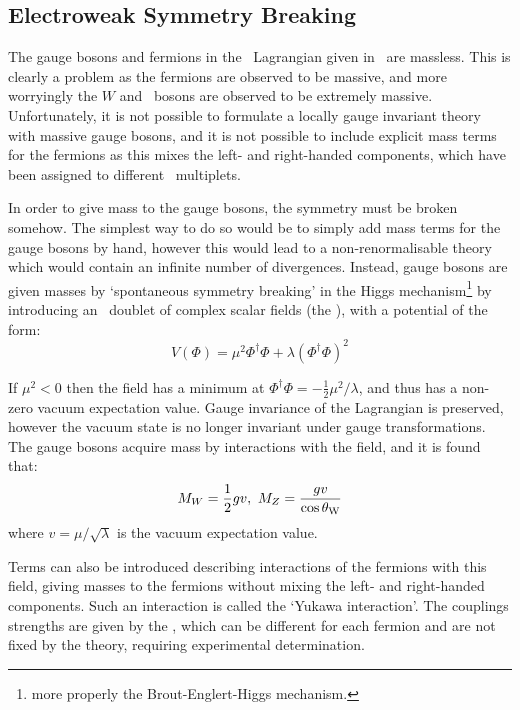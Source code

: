 \subsection{Electroweak Symmetry Breaking}

The gauge bosons and fermions in the \ew\ Lagrangian given
in~ are massless. This is clearly a problem as the fermions
are observed to be massive, and more worryingly the $W$ and \Z\ bosons are
observed to be extremely massive. Unfortunately, it is not possible to formulate a locally gauge invariant theory with massive
gauge bosons, and it is not possible to include explicit mass terms for the
fermions as this mixes the left- and right-handed components, which have been
assigned to different \sutwo\ multiplets. 

In order to give
mass to the gauge bosons, the symmetry must be broken somehow. The simplest way
to do so would be to simply add mass terms for the gauge bosons by hand, however
this would lead to a non-renormalisable theory which would contain an infinite
number of divergences. Instead, gauge bosons are given masses by `spontaneous
symmetry breaking' in the Higgs mechanism\footnote{more properly the Brout-Englert-Higgs
mechanism.} by introducing an \sutwo\ doublet of complex scalar fields (the ), with a potential of the form:
\begin{equation}
V(\Phi) =  \mu^{2}\Phi^{\dagger}\Phi + \lambda(\Phi^{\dagger}\Phi)^{2}
\end{equation}

If $\mu^{2} < 0$ then the field has a minimum at $\Phi^{\dagger}\Phi = -
\frac{1}{2} \mu^{2}/\lambda$, and thus has a non-zero vacuum expectation value. 
Gauge invariance of the Lagrangian is preserved, however the vacuum state is no
longer invariant under gauge transformations.
The gauge bosons acquire mass by interactions with the field, and it is found
that:
\begin{equation}
M_{W} = \frac{1}{2}gv, \ M_{Z} = \frac{gv}{\cos{\ensuremath{\theta_{\mathrm{W}}}}}
\end{equation}
where $v = \mu / \sqrt{\lambda}$ is the vacuum expectation value. 

Terms can also be
introduced describing interactions of the fermions with this field, giving
masses to the fermions without mixing the left- and right-handed components.
Such an interaction is called the `Yukawa interaction'. The couplings strengths
are given by the , which can be different for each
fermion and are not fixed by the theory, requiring experimental determination. 

